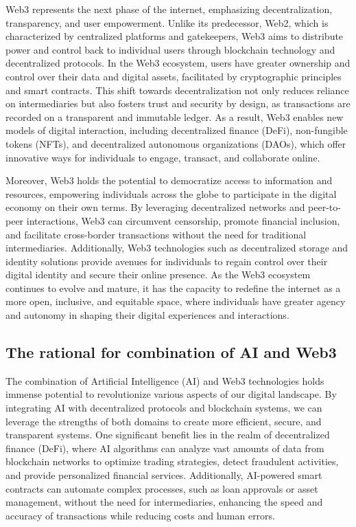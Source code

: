 \documentclass[conference]{IEEEtran}
\begin{document}
Web3 represents the next phase of the internet, emphasizing decentralization, transparency, and user empowerment. Unlike its predecessor, Web2, which is characterized by centralized platforms and gatekeepers, Web3 aims to distribute power and control back to individual users through blockchain technology and decentralized protocols. In the Web3 ecosystem, users have greater ownership and control over their data and digital assets, facilitated by cryptographic principles and smart contracts. This shift towards decentralization not only reduces reliance on intermediaries but also fosters trust and security by design, as transactions are recorded on a transparent and immutable ledger. As a result, Web3 enables new models of digital interaction, including decentralized finance (DeFi), non-fungible tokens (NFTs), and decentralized autonomous organizations (DAOs), which offer innovative ways for individuals to engage, transact, and collaborate online.

Moreover, Web3 holds the potential to democratize access to information and resources, empowering individuals across the globe to participate in the digital economy on their own terms. By leveraging decentralized networks and peer-to-peer interactions, Web3 can circumvent censorship, promote financial inclusion, and facilitate cross-border transactions without the need for traditional intermediaries. Additionally, Web3 technologies such as decentralized storage and identity solutions provide avenues for individuals to regain control over their digital identity and secure their online presence. As the Web3 ecosystem continues to evolve and mature, it has the capacity to redefine the internet as a more open, inclusive, and equitable space, where individuals have greater agency and autonomy in shaping their digital experiences and interactions.


\subsection{The rational for combination of AI and Web3}
The combination of Artificial Intelligence (AI) and Web3 technologies holds immense potential to revolutionize various aspects of our digital landscape. By integrating AI with decentralized protocols and blockchain systems, we can leverage the strengths of both domains to create more efficient, secure, and transparent systems. One significant benefit lies in the realm of decentralized finance (DeFi), where AI algorithms can analyze vast amounts of data from blockchain networks to optimize trading strategies, detect fraudulent activities, and provide personalized financial services. Additionally, AI-powered smart contracts can automate complex processes, such as loan approvals or asset management, without the need for intermediaries, enhancing the speed and accuracy of transactions while reducing costs and human errors.
\end{document}
